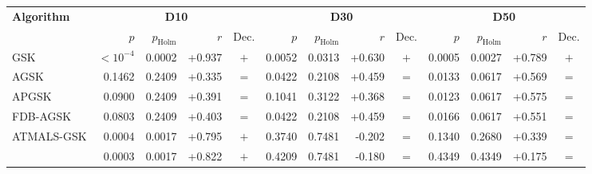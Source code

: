 \zebra
\begin{tabular}{lrrrcrrrcrrrc}
\toprule
\textbf{Algorithm} & \multicolumn{4}{c}{\textbf{D10}} & \multicolumn{4}{c}{\textbf{D30}} & \multicolumn{4}{c}{\textbf{D50}} \\
 & $p$ & $p_{\mathrm{Holm}}$ & $r$ & Dec. & $p$ & $p_{\mathrm{Holm}}$ & $r$ & Dec. & $p$ & $p_{\mathrm{Holm}}$ & $r$ & Dec. \\
\midrule
GSK & $<10^{-4}$ & 0.0002 & +0.937 & $+$ & 0.0052 & 0.0313 & +0.630 & $+$ & 0.0005 & 0.0027 & +0.789 & $+$ \\
AGSK & 0.1462 & 0.2409 & +0.335 & $=$ & 0.0422 & 0.2108 & +0.459 & $=$ & 0.0133 & 0.0617 & +0.569 & $=$ \\
APGSK & 0.0900 & 0.2409 & +0.391 & $=$ & 0.1041 & 0.3122 & +0.368 & $=$ & 0.0123 & 0.0617 & +0.575 & $=$ \\
FDB-AGSK & 0.0803 & 0.2409 & +0.403 & $=$ & 0.0422 & 0.2108 & +0.459 & $=$ & 0.0166 & 0.0617 & +0.551 & $=$ \\
ATMALS-GSK & 0.0004 & 0.0017 & +0.795 & $+$ & 0.3740 & 0.7481 & -0.202 & $=$ & 0.1340 & 0.2680 & +0.339 & $=$ \\
\egsk{} & 0.0003 & 0.0017 & +0.822 & $+$ & 0.4209 & 0.7481 & -0.180 & $=$ & 0.4349 & 0.4349 & +0.175 & $=$ \\
\bottomrule
\end{tabular}
